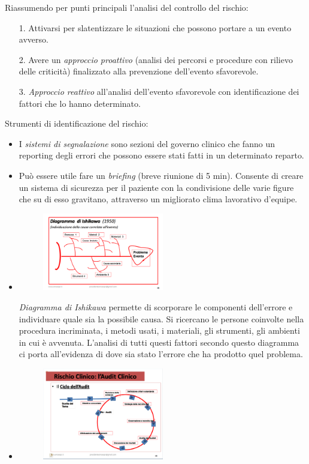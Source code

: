 Riassumendo per punti principali l'analisi del controllo del rischio:

\begin{itemize}
\item[1.]
  Attivarsi per slatentizzare le situazioni che possono portare a un
  evento avverso.
\item[2.]
  Avere un \emph{approccio proattivo} (analisi dei percorsi e procedure
  con rilievo delle criticità) finalizzato alla prevenzione dell'evento
  sfavorevole.
\item[3.]
  \emph{Approccio reattivo} all'analisi dell'evento sfavorevole con
  identificazione dei fattori che lo hanno determinato.
\end{itemize}
Strumenti di identificazione del rischio:

\begin{itemize}
\item
  I \emph{sistemi di segnalazione} sono sezioni del governo clinico che
  fanno un reporting degli errori che possono essere stati fatti in un
  determinato reparto.
\item
  Può essere utile fare un \emph{briefing} (breve riunione di 5 min).
  Consente di creare un sistema di sicurezza per il paziente con la
  condivisione delle varie figure che su di esso gravitano, attraverso
  un migliorato clima lavorativo d'equipe.
\item
  \begin{figure}[!ht]
\centering
	\includegraphics[width=0.5\textwidth]{30/image4.png}
	\end{figure}	
	\emph{Diagramma
  di Ishikawa} permette di scorporare le componenti dell'errore e
  individuare quale sia la possibile causa. Si ricercano le persone
  coinvolte nella procedura incriminata, i metodi usati, i materiali,
  gli strumenti, gli ambienti in cui è avvenuta. L'analisi di tutti
  questi fattori secondo questo diagramma ci porta all'evidenza di dove
  sia stato l'errore che ha prodotto quel problema.
\item
\begin{figure}[!ht]
\centering
	\includegraphics[width=0.5\textwidth]{30/image5.png}
	\end{figure}
  

\end{itemize}

